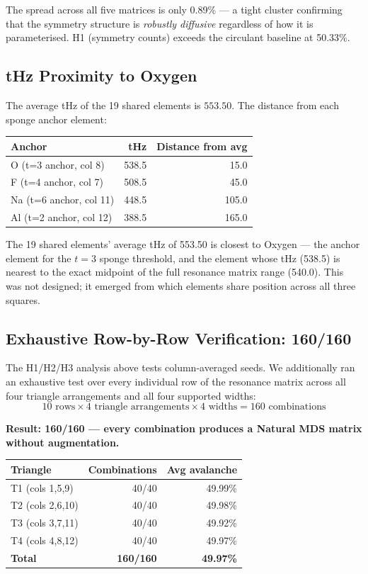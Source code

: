 \documentclass[preprint]{iacrtrans}
\begin{document}
The spread across all five matrices is only 0.89\% — a tight cluster
confirming that the symmetry structure is \emph{robustly diffusive}
regardless of how it is parameterised. H1 (symmetry counts) exceeds the
circulant baseline at 50.33\%.

\subsection{tHz Proximity to Oxygen}

The average tHz of the 19 shared elements is $553.50$. The distance
from each sponge anchor element:

\begin{center}
\begin{tabular}{lrr}
\toprule
Anchor & tHz & Distance from avg \\
\midrule
O  (t=3 anchor, col 8) & 538.5 & 15.0 \\
F  (t=4 anchor, col 7) & 508.5 & 45.0 \\
Na (t=6 anchor, col 11) & 448.5 & 105.0 \\
Al (t=2 anchor, col 12) & 388.5 & 165.0 \\
\bottomrule
\end{tabular}
\end{center}

The 19 shared elements' average tHz of 553.50 is closest to Oxygen —
the anchor element for the $t=3$ sponge threshold, and the element whose
tHz (538.5) is nearest to the exact midpoint of the full resonance matrix
range (540.0). This was not designed; it emerged from which elements share
position across all three squares.

\subsection{Exhaustive Row-by-Row Verification: 160/160}
\label{sec:exhaustive}

The H1/H2/H3 analysis above tests column-averaged seeds. We additionally
ran an exhaustive test over every individual row of the resonance matrix
across all four triangle arrangements and all four supported widths:
\[
  10 \text{ rows} \times 4 \text{ triangle arrangements} \times 4 \text{ widths}
  = 160 \text{ combinations}
\]

\textbf{Result: 160/160 — every combination produces a Natural MDS matrix
without augmentation.}

\begin{center}
\begin{tabular}{lrr}
\toprule
Triangle & Combinations & Avg avalanche \\
\midrule
T1 (cols 1,5,9)   & 40/40 & 49.99\% \\
T2 (cols 2,6,10)  & 40/40 & 49.98\% \\
T3 (cols 3,7,11)  & 40/40 & 49.92\% \\
T4 (cols 4,8,12)  & 40/40 & 49.97\% \\
\midrule
\textbf{Total}    & \textbf{160/160} & \textbf{49.97\%} \\
\bottomrule
\end{tabular}
\end{center}
\end{document}
